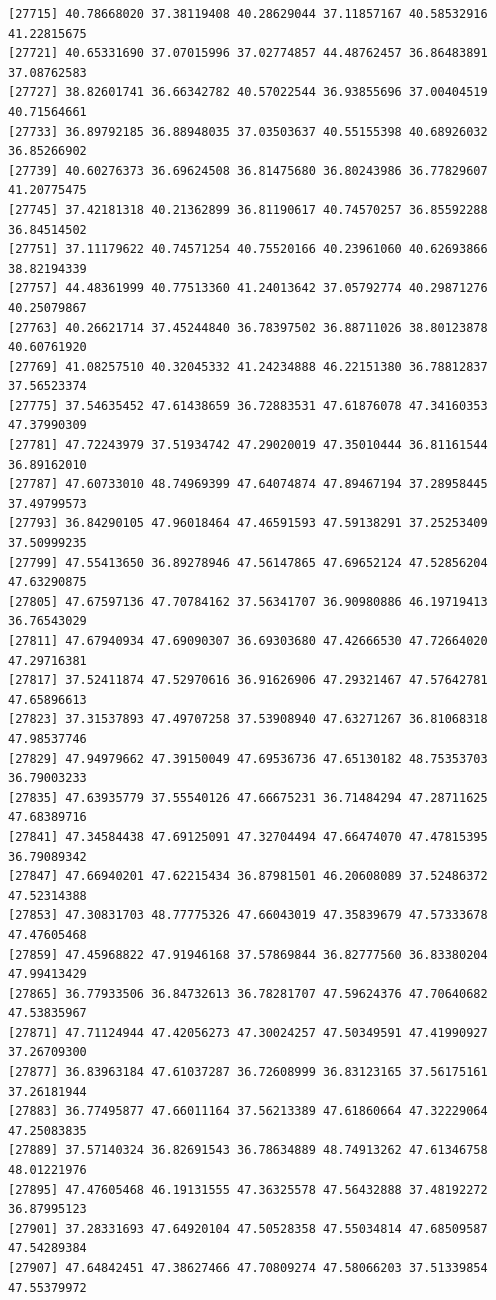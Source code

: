 \documentclass[
  letterpaper,
  DIV=11,
  numbers=noendperiod]{scrartcl}
\begin{document}
\begin{verbatim}
[27715] 40.78668020 37.38119408 40.28629044 37.11857167 40.58532916 41.22815675
[27721] 40.65331690 37.07015996 37.02774857 44.48762457 36.86483891 37.08762583
[27727] 38.82601741 36.66342782 40.57022544 36.93855696 37.00404519 40.71564661
[27733] 36.89792185 36.88948035 37.03503637 40.55155398 40.68926032 36.85266902
[27739] 40.60276373 36.69624508 36.81475680 36.80243986 36.77829607 41.20775475
[27745] 37.42181318 40.21362899 36.81190617 40.74570257 36.85592288 36.84514502
[27751] 37.11179622 40.74571254 40.75520166 40.23961060 40.62693866 38.82194339
[27757] 44.48361999 40.77513360 41.24013642 37.05792774 40.29871276 40.25079867
[27763] 40.26621714 37.45244840 36.78397502 36.88711026 38.80123878 40.60761920
[27769] 41.08257510 40.32045332 41.24234888 46.22151380 36.78812837 37.56523374
[27775] 37.54635452 47.61438659 36.72883531 47.61876078 47.34160353 47.37990309
[27781] 47.72243979 37.51934742 47.29020019 47.35010444 36.81161544 36.89162010
[27787] 47.60733010 48.74969399 47.64074874 47.89467194 37.28958445 37.49799573
[27793] 36.84290105 47.96018464 47.46591593 47.59138291 37.25253409 37.50999235
[27799] 47.55413650 36.89278946 47.56147865 47.69652124 47.52856204 47.63290875
[27805] 47.67597136 47.70784162 37.56341707 36.90980886 46.19719413 36.76543029
[27811] 47.67940934 47.69090307 36.69303680 47.42666530 47.72664020 47.29716381
[27817] 37.52411874 47.52970616 36.91626906 47.29321467 47.57642781 47.65896613
[27823] 37.31537893 47.49707258 37.53908940 47.63271267 36.81068318 47.98537746
[27829] 47.94979662 47.39150049 47.69536736 47.65130182 48.75353703 36.79003233
[27835] 47.63935779 37.55540126 47.66675231 36.71484294 47.28711625 47.68389716
[27841] 47.34584438 47.69125091 47.32704494 47.66474070 47.47815395 36.79089342
[27847] 47.66940201 47.62215434 36.87981501 46.20608089 37.52486372 47.52314388
[27853] 47.30831703 48.77775326 47.66043019 47.35839679 47.57333678 47.47605468
[27859] 47.45968822 47.91946168 37.57869844 36.82777560 36.83380204 47.99413429
[27865] 36.77933506 36.84732613 36.78281707 47.59624376 47.70640682 47.53835967
[27871] 47.71124944 47.42056273 47.30024257 47.50349591 47.41990927 37.26709300
[27877] 36.83963184 47.61037287 36.72608999 36.83123165 37.56175161 37.26181944
[27883] 36.77495877 47.66011164 37.56213389 47.61860664 47.32229064 47.25083835
[27889] 37.57140324 36.82691543 36.78634889 48.74913262 47.61346758 48.01221976
[27895] 47.47605468 46.19131555 47.36325578 47.56432888 37.48192272 36.87995123
[27901] 37.28331693 47.64920104 47.50528358 47.55034814 47.68509587 47.54289384
[27907] 47.64842451 47.38627466 47.70809274 47.58066203 37.51339854 47.55379972

\end{verbatim}
\end{document}
